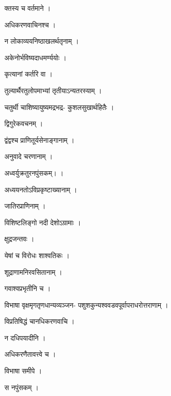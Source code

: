 \documentclass[10pt, openany]{book}
\begin{document}
\noindent क्तस्य च वर्तमाने ।

\noindent अधिकरणवाचिनश्च ।

\noindent न लोकाव्ययनिष्ठाखलर्थतृनाम् ।

\noindent अकेनोर्भविष्यदाधमर्ण्ययोः ।

\noindent कृत्यानां कर्तरि वा ।

\noindent तुल्यार्थैरतुलोपमाभ्यां तृतीयाऽन्यतरस्याम् ।

\noindent चतुर्थी चाशिष्यायुष्यमद्रभद्र- कुशलसुखार्थहितैः ।

\noindent द्विगुरेकवचनम् ।

\noindent द्वंद्वश्च प्राणितूर्यसेनाङ्गानाम् ।

\noindent अनुवादे चरणानाम् ।

\noindent अध्वर्युक्रतुरनपुंसकम्। ।

\noindent अध्ययनतोऽविप्रकृष्टाख्यानाम् ।

\noindent जातिरप्राणिनाम् ।

\noindent विशिष्टलिङ्गो नदी देशोऽग्रामाः ।

\noindent क्षुद्रजन्तवः ।

\noindent येषां च विरोधः शाश्वतिकः ।

\noindent शूद्राणामनिरवसितानाम् ।

\noindent गवाश्वप्रभृतीनि च ।

\noindent विभाषा वृक्षमृगतृणधान्यव्यञ्जन- पशुशकुन्यश्ववडवपूर्वापराधरोत्तराणाम् ।

\noindent विप्रतिषिद्धं चानधिकरणवाचि ।

\noindent न दधिपयादीनि ।

\noindent अधिकरणैतावत्त्वे च ।

\noindent विभाषा समीपे ।

\noindent स नपुंसकम् ।
\end{document}
